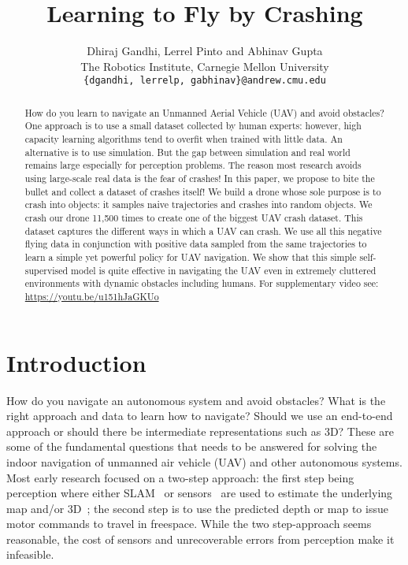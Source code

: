 \documentclass[letterpaper, 10 pt, conference]{ieeeconf}  %
\title{\LARGE \bf
Learning to Fly by Crashing
}
\author{
Dhiraj Gandhi, Lerrel Pinto and Abhinav Gupta\\
The Robotics Institute, Carnegie Mellon University\\
\texttt{\{dgandhi, lerrelp, gabhinav\}@andrew.cmu.edu}
}
\begin{document}
\maketitle
\thispagestyle{empty}
\pagestyle{empty}

\begin{abstract}
How do you learn to navigate an Unmanned Aerial Vehicle (UAV) and avoid obstacles? One approach is to use a small dataset collected by human experts: however, high capacity learning algorithms tend to overfit when trained with little data. An alternative is to use simulation. But the gap between simulation and real world remains large especially for perception problems. The reason most research avoids using large-scale real data is the fear of crashes! In this paper, we propose to bite the bullet  and  collect  a  dataset  of  crashes  itself!  We  build  a drone whose sole purpose is to crash into objects: it samples naive trajectories and crashes into random objects. We crash our drone 11,500 times to create one of the biggest UAV crash dataset. This dataset  captures  the different ways in which a  UAV  can crash. We use all this negative flying data in conjunction with positive data  sampled  from  the same  trajectories  to  learn  a  simple  yet  powerful  policy  for  UAV  navigation.  We  show that this simple  self-supervised  model  is  quite  effective  in navigating the UAV even in extremely cluttered environments with dynamic obstacles including humans. For supplementary video see: \url{https://youtu.be/u151hJaGKUo}

\end{abstract}
\section{Introduction}
How do you navigate an autonomous system and avoid obstacles? What is the right approach and data to learn how to navigate? Should we use an end-to-end approach or should there be intermediate representations such as 3D? These are some of the fundamental questions that needs to be answered for solving the indoor navigation of unmanned air vehicle (UAV) and other autonomous systems. Most early research focused on a two-step approach: the first step being perception where either SLAM~\cite{bachrach2009autonomous} or sensors~\cite{zhang2016learning} are used to estimate the underlying map and/or 3D~\cite{bills2011autonomous}; the second step is to use the predicted depth or map to issue motor commands to travel in freespace. While the two step-approach seems reasonable, the cost of sensors and unrecoverable errors from perception make it infeasible. 
\end{document}
